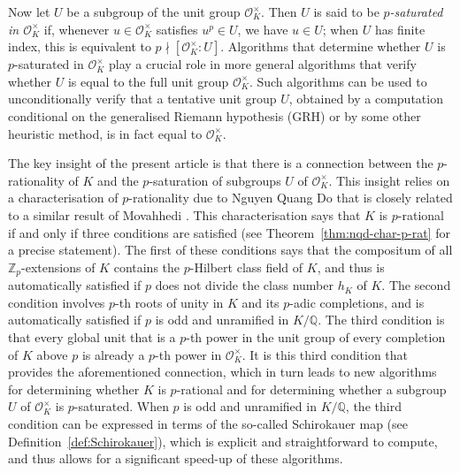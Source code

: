\documentclass[12pt, a4paper, usenames]{amsart}
\newcommand{\Z}{\mathbb{Z}}
\newcommand{\Q}{\mathbb{Q}}
\theoremstyle{plain}
\theoremstyle{remark}
\theoremstyle{definition}
\begin{document}
Now let $U$ be a subgroup of the unit group $\mathcal{O}_{K}^{\times}$. 
Then $U$ is said to be \emph{$p$-saturated in $\mathcal{O}_{K}^{\times}$}
if, whenever $u \in \mathcal{O}_{K}^{\times}$ satisfies $u^{p} \in U$, 
we have $u \in U$; when $U$ has finite index, this is equivalent to 
$p \nmid [\mathcal{O}_{K}^{\times} : U]$.
Algorithms that determine whether $U$ is $p$-saturated in 
$\mathcal{O}_{K}^{\times}$ play a crucial role in more general algorithms that verify 
whether $U$ is equal to the full unit group $\mathcal{O}_{K}^{\times}$. 
Such algorithms can be used to unconditionally verify that a tentative unit group $U$,
obtained by a computation conditional on the generalised Riemann hypothesis (GRH) or by some other heuristic method, is in fact equal to $\mathcal{O}_{K}^{\times}$.

The key insight of the present article is that there is a connection
between the $p$-rationality of $K$
and the $p$-saturation of subgroups $U$ of $\mathcal{O}_{K}^{\times}$. 
This insight relies on a characterisation of $p$-rationality due to 
Nguyen Quang Do \cite{do2025greenbergsgeneralizedconjecturefamilies}
that is closely related to a similar result of Movahhedi \cite{MR1124802}.
This characterisation says that $K$ is $p$-rational if and only if three conditions are
satisfied (see Theorem~\ref{thm:nqd-char-p-rat} for a precise statement). 
The first of these conditions says that the compositum 
of all $\Z_{p}$-extensions of $K$ contains the $p$-Hilbert class field of $K$,
and thus is automatically satisfied if $p$ does not divide the class number $h_{K}$ of $K$.
The second condition involves $p$-th roots of unity in $K$ and its 
$p$-adic completions, and is automatically satisfied if $p$ is odd and unramified in $K/\Q$.
The third condition is that every global unit that is a $p$-th power in the unit group
of every completion of $K$ above $p$ is already a $p$-th power in $\mathcal{O}_{K}^{\times}$.
It is this third condition that provides the aforementioned connection,
which in turn leads to new algorithms for determining whether $K$ is $p$-rational
and for determining whether a subgroup $U$ of $\mathcal{O}_{K}^{\times}$
is $p$-saturated. When $p$ is odd and unramified in $K/\Q$, 
the third condition can be expressed in terms of the 
so-called Schirokauer map \cite{MR1253502} 
(see Definition~\ref{def:Schirokauer}), which is explicit 
and straightforward to compute, and thus
allows for a significant speed-up of these algorithms.
\end{document}
